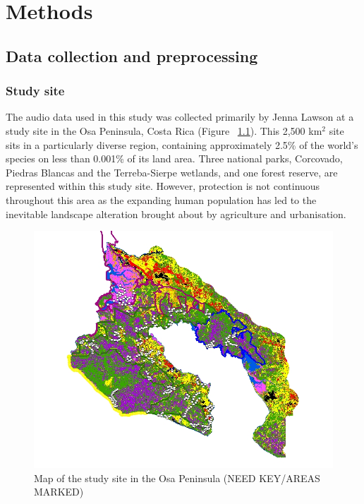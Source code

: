 
\chapter{Methods} %

\label{Methods} %


\section{Data collection and preprocessing}


\subsection{Study site}

The audio data used in this study was collected primarily by Jenna Lawson at a study site in the Osa Peninsula, Costa Rica (Figure ~\ref{fig:peninsula_map}). This 2,500 km$^2$ site sits in a particularly diverse region, containing approximately 2.5\% of the world's species on less than 0.001\% of its land area. Three national parks, Corcovado, Piedras Blancas and the Terreba-Sierpe wetlands, and one forest reserve, are represented within this study site. However, protection is not continuous throughout this area as the expanding human population has led to the inevitable landscape alteration brought about by agriculture and urbanisation.

\begin{figure}
\includegraphics[width=1.2\textwidth,center]{Figures/peninsula_map}\caption[Map of Osa Peninsula]{Map of the study site in the Osa Peninsula \cite{Lawson2019} (NEED KEY/AREAS MARKED)}\label{fig:peninsula_map}
\end{figure}

